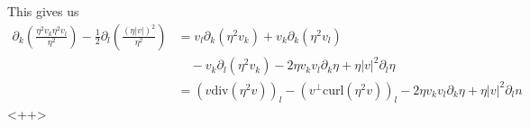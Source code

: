\documentclass[a4paper]{article}
\newcommand{\curl}{\mathrm{curl}}
\renewcommand{\div}{\mathrm{div}}
\begin{document}
This gives us
\begin{align}
  \partial_k \left( \frac{\eta^2 v_k \eta^2 v_l}{\eta^2} \right) - \frac{1}{2} \partial_l \left( \frac{(\eta |v|)^2}{\eta^2} \right) &= v_l \partial_k (\eta^2
  v_k) + v_k \partial_k( \eta^2 v_l ) \nonumber \\
  &\quad - v_k \partial_l (\eta^2 v_k) - 2 \eta v_k v_l \partial_k \eta + \eta |v|^2 \partial_l \eta \nonumber \\
  &= (v \div( \eta^2 v ) )_l - (v^\perp \curl( \eta^2 v) )_l - 2 \eta v_k v_l \partial_k \eta + \eta |v|^2 \partial_l n
  \label{eqn:quot_rules}
\end{align}<++>

\end{document}
